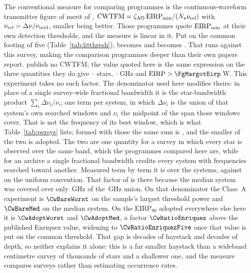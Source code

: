 The conventional measure for comparing programmes is the continuous-waveform
transmitter figure of merit of \citet{Enriquez2017},
$\mathrm{CWTFM}=\zeta_{\rm AO}\,\mathrm{EIRP}_{\rm min}/
(N_{\star}\nu_{\rm rel})$ with $\nu_{\rm rel}=\Delta\nu/\nu_{\rm mid}$,
smaller being better. Those programmes quote $\mathrm{EIRP}_{\rm min}$ at their own detection
thresholds, and the measure is linear in it. Put on the common footing of
five (Table~\ref{tab:litthresh}), \FomLitEnriquez{} becomes
\FomLitEnriquezFive{} and \FgLitMargot{} becomes \FgLitMargotFive. That runs
against this survey, making the comparison programmes deeper than their own
papers report. \citet{Margot2023} publish no
CWTFM; the value quoted here is the same expression on the three quantities
they do give -- \FomMargotN{} stars, \FomMargotLo--\FomMargotHi\,GHz and
$\mathrm{EIRP}>\FgMargotEirp$\,W. This experiment takes no such factor. The
denominator used here modifies theirs: in place of a single survey-wide
fractional bandwidth it is the star-bandwidth product
$\sum_{i}\Delta\nu_{i}/\nu_{i}$, one term per system, in which
$\Delta\nu_{i}$ is the union of that system's own searched windows and
$\nu_{i}$ the midpoint of the span those windows cover. That is not the frequency of its best window, which is
what Table~\ref{tab:persys} lists; formed with those the same sum is
\CwSigmaBest, and the smaller of the two is adopted. The two are one quantity
for a survey in which every star is observed over the same band, which the
programmes compared here are, while for an archive a single fractional
bandwidth credits every system with frequencies searched toward another. Measured term by term it is \CwSigma{} over the \CwNSys{} systems, against
\CwUniform{} on the uniform convention. That factor of \CwRatio{} is there
because the median system was covered over only \SysUnionAMed\,GHz of the
\CvUnionA\,GHz union. On that denominator the Class~A experiment is
$\CwBareWorst$ on the sample's largest threshold power and $\CwBareMed$ on
the median system. On the $\mathrm{EIRP}_{90}$ adopted everywhere else here
it is $\CwAdoptWorst$ and $\CwAdoptMed$, a factor $\CwRatioEnriquez$ above
the published Enriquez value, widening to $\CwRatioEnriquezFive$ once that
value is put on the common threshold. That
gap is \CwBandDex{} decades of haystack and \CwEirpDex{} decades of depth, so
neither explains it alone: this is a far smaller haystack than a wideband
centimetre survey of thousands of stars and a shallower one, and the measure
compares surveys rather than estimating occurrence rates.

